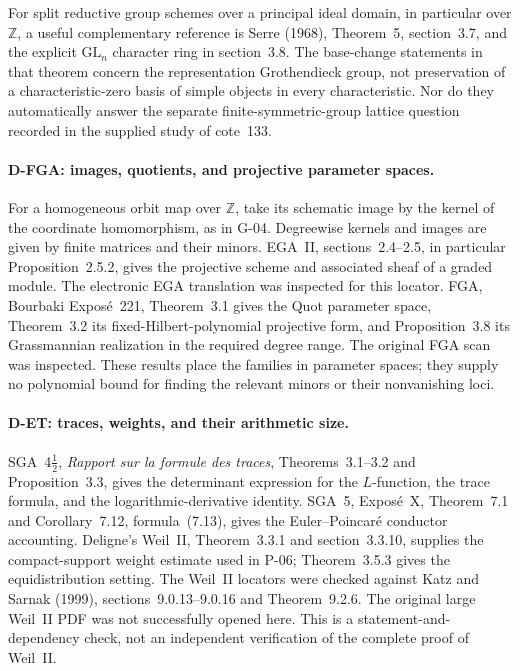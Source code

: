 For split reductive group schemes over a principal ideal domain, in particular over $\mathbb Z$, a useful complementary reference is Serre (1968), Theorem~5, section~3.7, and the explicit $\mathrm{GL}_n$ character ring in section~3.8. The base-change statements in that theorem concern the representation Grothendieck group, not preservation of a characteristic-zero basis of simple objects in every characteristic. Nor do they automatically answer the separate finite-symmetric-group lattice question recorded in the supplied study of cote~133.

\paragraph{D-FGA: images, quotients, and projective parameter spaces.}
For a homogeneous orbit map over $\mathbb Z$, take its schematic image by the kernel of the coordinate homomorphism, as in G-04. Degreewise kernels and images are given by finite matrices and their minors. EGA~II, sections~2.4--2.5, in particular Proposition~2.5.2, gives the projective scheme and associated sheaf of a graded module. The electronic EGA translation was inspected for this locator. FGA, Bourbaki Expos\'e~221, Theorem~3.1 gives the Quot parameter space, Theorem~3.2 its fixed-Hilbert-polynomial projective form, and Proposition~3.8 its Grassmannian realization in the required degree range. The original FGA scan was inspected. These results place the families in parameter spaces; they supply no polynomial bound for finding the relevant minors or their nonvanishing loci.

\paragraph{D-ET: traces, weights, and their arithmetic size.}
SGA~4$\frac12$, \emph{Rapport sur la formule des traces}, Theorems~3.1--3.2 and Proposition~3.3, gives the determinant expression for the $L$-function, the trace formula, and the logarithmic-derivative identity. SGA~5, Expos\'e~X, Theorem~7.1 and Corollary~7.12, formula~(7.13), gives the Euler--Poincar\'e conductor accounting. Deligne's Weil~II, Theorem~3.3.1 and section~3.3.10, supplies the compact-support weight estimate used in P-06; Theorem~3.5.3 gives the equidistribution setting. The Weil~II locators were checked against Katz and Sarnak (1999), sections~9.0.13--9.0.16 and Theorem~9.2.6. The original large Weil~II PDF was not successfully opened here. This is a statement-and-dependency check, not an independent verification of the complete proof of Weil~II.

